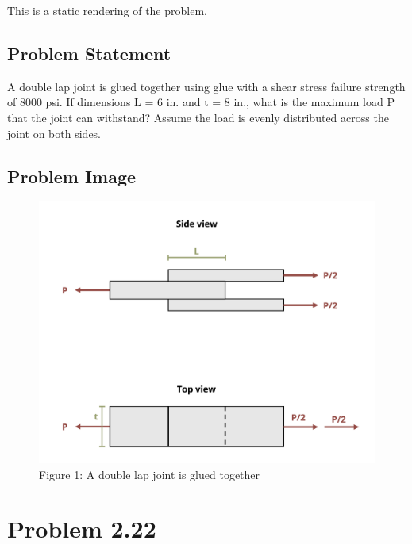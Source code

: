\documentclass[
  letterpaper,
  DIV=11,
  numbers=noendperiod]{scrreprt}
\begin{document}

This is a static rendering of the problem.

\section*{Problem Statement}\label{problem-statement-7}


A double lap joint is glued together using glue with a shear stress
failure strength of 8000 psi. If dimensions L = 6 in. and t = 8 in.,
what is the maximum load P that the joint can withstand? Assume the load
is evenly distributed across the joint on both sides.

\section*{Problem Image}\label{problem-image-17}


\begin{figure}[H]

{\centering \includegraphics{images/164.png}

}

\caption{Figure 1: A double lap joint is glued together}

\end{figure}%

\chapter*{Problem 2.22}\label{problem-2.22-1}
\end{document}
